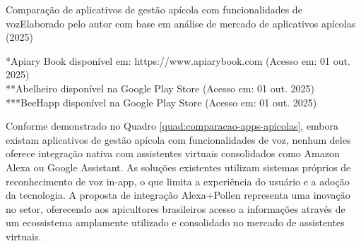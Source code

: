 \begin{quadro}{Comparação de aplicativos de gestão apícola com funcionalidades de voz}{Elaborado pelo autor com base em análise de mercado de aplicativos apícolas (2025)}
\label{quad:comparacao-apps-apicolas}
\renewcommand{\arraystretch}{1.5}
\raggedright
\small
*Apiary Book disponível em: https://www.apiarybook.com (Acesso em: 01 out. 2025)\\
**Abelheiro disponível na Google Play Store (Acesso em: 01 out. 2025)\\
***BeeHapp disponível na Google Play Store (Acesso em: 01 out. 2025)
\end{quadro}

Conforme demonstrado no Quadro \ref{quad:comparacao-apps-apicolas}, embora existam aplicativos de gestão apícola com funcionalidades de voz, nenhum deles oferece integração nativa com assistentes virtuais consolidados como Amazon Alexa ou Google Assistant. As soluções existentes utilizam sistemas próprios de reconhecimento de voz in-app, o que limita a experiência do usuário e a adoção da tecnologia. A proposta de integração Alexa+Pollen representa uma inovação no setor, oferecendo aos apicultores brasileiros acesso a informações através de um ecossistema amplamente utilizado e consolidado no mercado de assistentes virtuais.